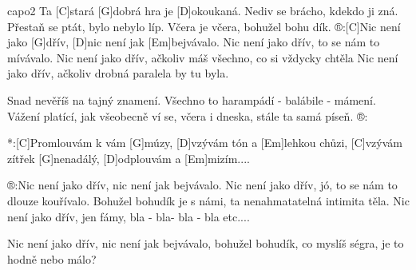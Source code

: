 \hfill capo2
Ta [C]stará [G]dobrá hra je [D]okoukaná.
Nediv se brácho, kdekdo ji zná.
Přestaň se ptát, bylo nebylo líp.
Včera je včera, bohužel bohu dík.
®:[C]Nic není jako [G]dřív, [D]nic není jak [Em]bejvávalo.
Nic není jako dřív, to se nám to mívávalo.
Nic není jako dřív, ačkoliv máš všechno,
co si vždycky chtěla
Nic není jako dřív, ačkoliv drobná paralela by tu byla.

Snad nevěříš na tajný znamení.
Všechno to harampádí - balábile - mámení.
Vážení platící, jak všeobecně ví se,
včera i dneska, stále ta samá píseň.
®:

*:[C]Promlouvám k vám [G] múzy,
[D]vzývám tón a [Em]lehkou chůzi,
[C]vzývám zítřek [G]nenadálý,
[D]odplouvám a [Em]mizím....

®:Nic není jako dřív, nic není jak bejvávalo.
Nic není jako dřív, jó, to se nám to dlouze kouřívalo.
Bohužel bohudík je s námi, ta nenahmatatelná intimita těla.
Nic není jako dřív, jen fámy,
bla - bla- bla - bla etc....

Nic není jako dřív, nic není jak bejvávalo,
bohužel bohudík, co myslíš ségra, je to hodně nebo málo?\columnbreak